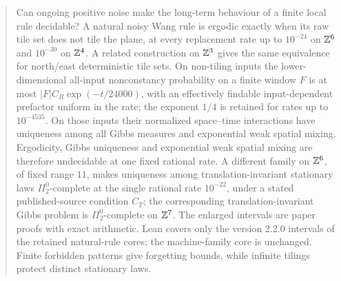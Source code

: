 \begin{abstract}
Can ongoing positive noise make the long-term behaviour of a finite local rule decidable? A natural noisy Wang rule is ergodic exactly when its raw tile set does not tile the plane, at every replacement rate up to $10^{-24}$ on $\Z^6$ and $10^{-30}$ on $\Z^4$. A related construction on $\Z^3$ gives the same equivalence for north/east deterministic tile sets. On non-tiling inputs the lower-dimensional all-input nonconstancy probability on a finite window $F$ is at most $|F|C_R\exp(-t/24000)$, with an effectively findable input-dependent prefactor uniform in the rate; the exponent $1/4$ is retained for rates up to $10^{-4535}$. On those inputs their normalized space--time interactions have uniqueness among all Gibbs measures and exponential weak spatial mixing. Ergodicity, Gibbs uniqueness and exponential weak spatial mixing are therefore undecidable at one fixed rational rate. A different family on $\Z^6$, of fixed range $11$, makes uniqueness among translation-invariant stationary laws $\Pi^0_2$-complete at the single rational rate $10^{-22}$, under a stated published-source condition $C_T$; the corresponding translation-invariant Gibbs problem is $\Pi^0_2$-complete on $\Z^7$. The enlarged intervals are paper proofs with exact arithmetic. Lean covers only the version 2.2.0 intervals of the retained natural-rule cores; the machine-family core is unchanged. Finite forbidden patterns give forgetting bounds, while infinite tilings protect distinct stationary laws.
\end{abstract}
